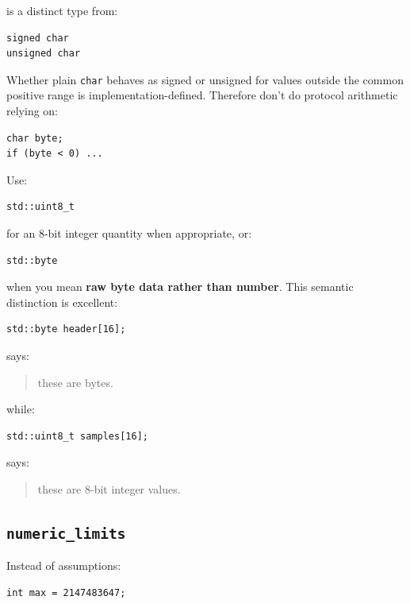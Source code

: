 is a distinct type from:

\begin{verbatim}
signed char
unsigned char
\end{verbatim}

Whether plain \texttt{char} behaves as signed or unsigned for values outside the common positive range is implementation-defined. Therefore don't do protocol arithmetic relying on:

\begin{verbatim}
char byte;
if (byte < 0) ...
\end{verbatim}

Use:

\begin{verbatim}
std::uint8_t
\end{verbatim}

for an 8-bit integer quantity when appropriate, or:

\begin{verbatim}
std::byte
\end{verbatim}

when you mean \textbf{raw byte data rather than number}. This semantic distinction is excellent:

\begin{verbatim}
std::byte header[16];
\end{verbatim}

says:

\begin{quote}
these are bytes.
\end{quote}

while:

\begin{verbatim}
std::uint8_t samples[16];
\end{verbatim}

says:

\begin{quote}
these are 8-bit integer values.
\end{quote}

\subsection{\texorpdfstring{\texttt{numeric\_limits}}{numeric\_limits}}\label{01-foundations-i-ch002-numeric_limits}

Instead of assumptions:

\begin{verbatim}
int max = 2147483647;
\end{verbatim}

